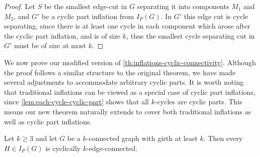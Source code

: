 \documentclass[12pt, twoside]{book}
\begin{document}
\begin{proof}
	Let $S$ be the smallest edge-cut in $G$ separating it into components $M_1$ and $M_2$, and $G'$ be a cyclic part inflation from $I_P(G)$. In $G'$ this edge cut is cycle separating, since there is at least one cycle in each component which arose after the cyclic part inflation, and is of size $k$, thus the smallest cycle separating cut in $G'$ must be of size at most $k$.
\end{proof}

We now prove our modified version of \cref{th:inflations-cyclic-connectivity}. Although the proof follows a similar structure to the original theorem, we have made several adjustments to accommodate arbitrary cyclic parts. It is worth noting that traditional inflations can be viewed as a special case of cyclic part inflations, since \cref{lem:each-cycle-cyclic-part} shows that all $k$-cycles are cyclic parts. This means our new theorem naturally extends to cover both traditional inflations as well as cyclic part inflations.

\begin{theorem}
	Let $k\geq 3$ and let $G$ be a $k$-connected graph with girth at least $k$. Then every  $H\in I_P(G)$ is cyclically $k$-edge-connected.
\end{theorem}
\end{document}
